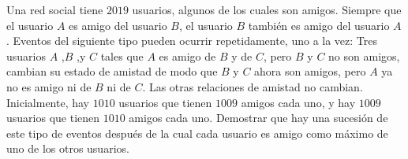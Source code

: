 Una red social tiene $2019$ usuarios, algunos de los cuales son amigos. Siempre que el usuario $A$ es amigo del usuario $B$, el usuario $B$ también es amigo del usuario $A$. Eventos del siguiente tipo pueden ocurrir repetidamente, uno a la vez:
Tres usuarios $A$ ,$B$ ,y $C$ tales que $A$ es amigo de $B$ y de $C$, pero $B$ y $C$ no son amigos, cambian su estado de amistad de modo que $B$ y $C$ ahora son amigos, pero $A$ ya no es amigo ni de $B$ ni de $C$. Las otras relaciones de amistad no cambian.
Inicialmente, hay $1010$ usuarios que tienen $1009$ amigos cada uno, y hay $1009$ usuarios que tienen $1010$ amigos cada uno. Demostrar que hay una sucesión de este tipo de eventos después de la cual cada usuario es amigo como máximo de uno de los otros usuarios.